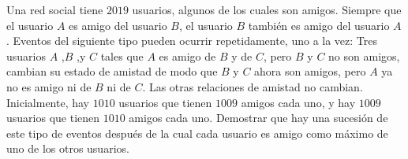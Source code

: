 Una red social tiene $2019$ usuarios, algunos de los cuales son amigos. Siempre que el usuario $A$ es amigo del usuario $B$, el usuario $B$ también es amigo del usuario $A$. Eventos del siguiente tipo pueden ocurrir repetidamente, uno a la vez:
Tres usuarios $A$ ,$B$ ,y $C$ tales que $A$ es amigo de $B$ y de $C$, pero $B$ y $C$ no son amigos, cambian su estado de amistad de modo que $B$ y $C$ ahora son amigos, pero $A$ ya no es amigo ni de $B$ ni de $C$. Las otras relaciones de amistad no cambian.
Inicialmente, hay $1010$ usuarios que tienen $1009$ amigos cada uno, y hay $1009$ usuarios que tienen $1010$ amigos cada uno. Demostrar que hay una sucesión de este tipo de eventos después de la cual cada usuario es amigo como máximo de uno de los otros usuarios.